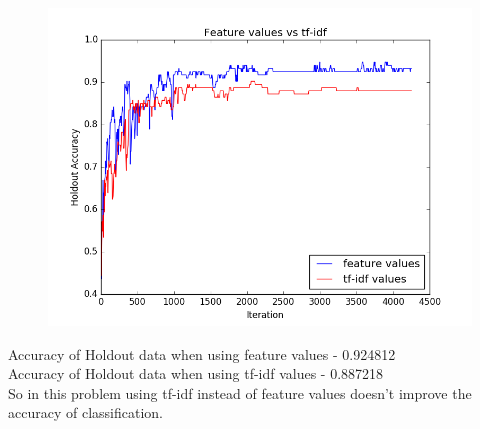 \documentclass{article}
\begin{document}
\begin{enumerate}
\begin{figure}[h]
  \centering
  \begin{minipage}[b]{0.6\textwidth}
    \includegraphics[width=\textwidth]{images/tfidf.png}
  \end{minipage}
\end{figure}

Accuracy of Holdout data when using feature values - 0.924812\\
Accuracy of Holdout data when using  tf-idf  values - 0.887218 \\

So in this problem using tf-idf instead of feature values doesn't improve the accuracy of classification.
\end{enumerate}
\end{document}
